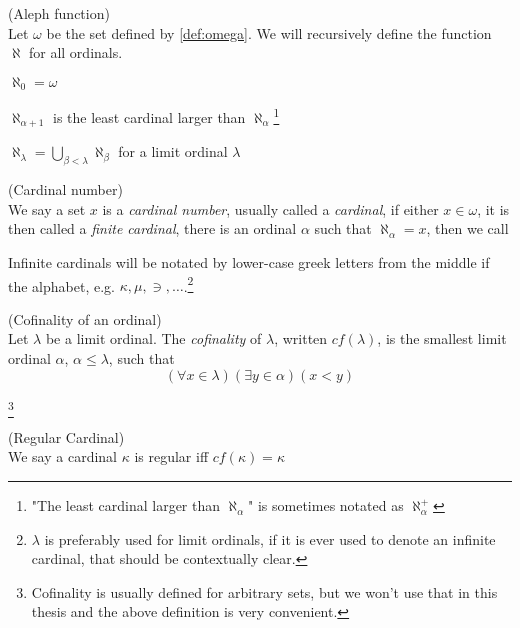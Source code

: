 \begin{definition}{(Aleph function)}\label{def:aleph}\\
Let $\omega$ be the set defined by \ref{def:omega}.
We will recursively define the function $\aleph$ for all ordinals.
\bce[(i)]
\item $\aleph_0 = \omega$
\item $\aleph_{\alpha+1}$ is the least cardinal larger than $\aleph_\alpha$\footnote{"The least cardinal larger than $\aleph_\alpha$" is sometimes notated as $\aleph_\alpha^{+}$}
\item $\aleph_\lambda = \bigcup_{\beta < \lambda}\aleph_\beta$ for a limit ordinal $\lambda$
\ece
\end{definition}

\begin{definition}{(Cardinal number)}\label{def:cardinal}\\
We say a set $x$ is a \emph{cardinal number}, usually called a \emph{cardinal}, if either $x \in \omega$, it is then called a \emph{finite cardinal}, 
there is an ordinal $\alpha$ such that $\aleph_\alpha = x$, then we call 
\end{definition}
Infinite cardinals will be notated by lower-case greek letters from the middle if the alphabet, e.g. $\kappa, \mu, \ni, \ldots$.\footnote{$\lambda$ is preferably used for limit ordinals, if it is ever used to denote an infinite cardinal, that should be contextually clear.}

\begin{definition}{(Cofinality of an ordinal)}\label{def:cofinality}\\ %
Let $\lambda$ be a limit ordinal. The \emph{cofinality} of $\lambda$, written $cf(\lambda)$, is the smallest limit ordinal $\alpha$, $\alpha \leq \lambda$, such that 
\begin{equation}
(\forall x \in \lambda)(\exists y \in \alpha)(x < y)
\end{equation}
\end{definition}\footnote{Cofinality is usually defined for arbitrary sets, but we won't use that in this thesis and the above definition is very convenient.}

\begin{definition}{(Regular Cardinal)}\label{def:regular_cardinal}\\
We say a cardinal $\kappa$ is regular iff $cf(\kappa) = \kappa$
\end{definition}

